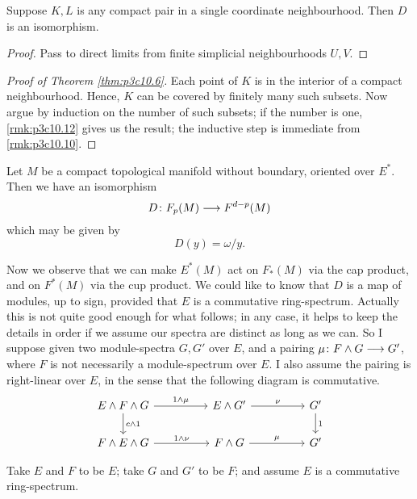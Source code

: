 \documentclass[../main]{subfiles}
\begin{document}
\begin{remark}\label{rmk:p3c10.12}
Suppose $K,L$ is any compact pair in a single coordinate neighbourhood. Then $D$ is an isomorphism.
\end{remark}
\begin{proof}
Pass to direct limits from finite simplicial neighbourhoods $U,V$.
\end{proof}
\begin{proof}[Proof of Theorem \ref{thm:p3c10.6}]
Each point of $K$ is in the interior of a compact neighbourhood. Hence, $K$ can be covered by finitely many such subsets. Now argue by induction on the number of such subsets; if the number is one, \ref{rmk:p3c10.12} gives us the result; the inductive step is immediate from \ref{rmk:p3c10.10}.
\end{proof}
\begin{corollary}\label{cor:p3c10.13}
Let $M$ be a compact topological manifold without boundary, oriented over $E^*$. Then we have an isomorphism
\[D \colon F_p(M) \longrightarrow F^{d-p}(M)\]
which may be given by
\[D(y) = \omega / y.\]
\end{corollary}
Now we observe that we can make $E^*(M)$ act on $F_*(M)$ via the cap product, and on $F^*(M)$ via the cup product. We could like to know that $D$ is a map of modules, up to sign, provided that $E$ is a commutative ring-spectrum. Actually this is not quite good enough for what follows; in any case, it helps to keep the details in order if we assume our spectra are distinct as long as we can. So I suppose given two module-spectra $G,G'$ over $E$, and a pairing $\mu \colon F \wedge G \longrightarrow G'$, where $F$ is not necessarily a module-spectrum over $E$. I also assume the pairing is right-linear over $E$, in the sense that the following diagram is commutative.
\[
\begin{tikzcd}
E\wedge F \wedge G \arrow[rr, "1 \wedge \mu"] \arrow[d, "c \wedge 1"] &  & E\wedge G' \arrow[rr, "\nu"] &  & G' \arrow[d, "1"] \\
F \wedge E \wedge G \arrow[rr, "1 \wedge \nu"]                        &  & F\wedge G \arrow[rr, "\mu"]  &  & G'               
\end{tikzcd}
\]
\begin{examples}
Take $E$ and $F$ to be $E$; take $G$ and $G'$ to be $F$; and assume $E$ is a commutative ring-spectrum.
\end{examples}
\end{document}
